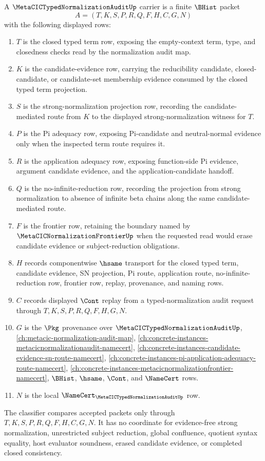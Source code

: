 \begin{definition}
\label{def:metacic-typed-normalization-audit-carrier}
A $\MetaCICTypedNormalizationAuditUp$ carrier is a finite $\BHist$ packet
$$
A=(T,K,S,P,R,Q,F,H,C,G,N)
$$
with the following displayed rows:
\begin{enumerate}
\item $T$ is the closed typed term row, exposing the empty-context term, type, and closedness checks read by the normalization audit map.
\item $K$ is the candidate-evidence row, carrying the reducibility candidate, closed-candidate, or candidate-set membership evidence consumed by the closed typed term projection.
\item $S$ is the strong-normalization projection row, recording the candidate-mediated route from $K$ to the displayed strong-normalization witness for $T$.
\item $P$ is the Pi adequacy row, exposing Pi-candidate and neutral-normal evidence only when the inspected term route requires it.
\item $R$ is the application adequacy row, exposing function-side Pi evidence, argument candidate evidence, and the application-candidate handoff.
\item $Q$ is the no-infinite-reduction row, recording the projection from strong normalization to absence of infinite beta chains along the same candidate-mediated route.
\item $F$ is the frontier row, retaining the boundary named by $\MetaCICNormalizationFrontierUp$ when the requested read would erase candidate evidence or subject-reduction obligations.
\item $H$ records componentwise $\hsame$ transport for the closed typed term, candidate evidence, SN projection, Pi route, application route, no-infinite-reduction row, frontier row, replay, provenance, and naming rows.
\item $C$ records displayed $\Cont$ replay from a typed-normalization audit request through $T,K,S,P,R,Q,F,H,G,N$.
\item $G$ is the $\Pkg$ provenance over $\MetaCICTypedNormalizationAuditUp$, \autoref{ch:metacic-normalization-audit-map}, \autoref{ch:concrete-instances-metacicnormalizationaudit-namecert}, \autoref{ch:concrete-instances-candidate-evidence-sn-route-namecert}, \autoref{ch:concrete-instances-pi-application-adequacy-route-namecert}, \autoref{ch:concrete-instances-metacicnormalizationfrontier-namecert}, $\BHist$, $\hsame$, $\Cont$, and $\NameCert$ rows.
\item $N$ is the local $\NameCert_{\MetaCICTypedNormalizationAuditUp}$ row.
\end{enumerate}
The classifier compares accepted packets only through $T,K,S,P,R,Q,F,H,C,G,N$. It has no coordinate for evidence-free strong normalization, unrestricted subject reduction, global confluence, quotient syntax equality, host evaluator soundness, erased candidate evidence, or completed closed consistency.
\end{definition}

